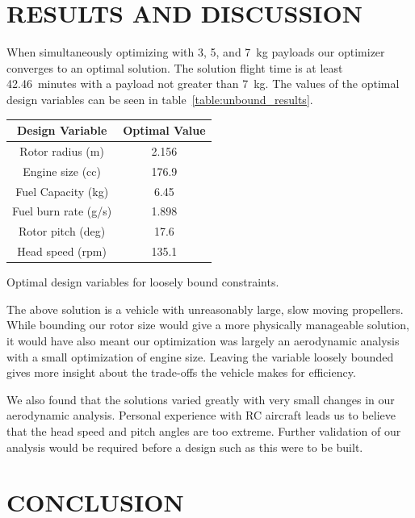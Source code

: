 \documentclass[letterpaper, 10 pt, conference]{ieeeconf}  %
\makeatletter
\newenvironment{tablehere}
  {\def\@captype{table}}
  {}
\makeatother
\begin{document}
\section{RESULTS AND DISCUSSION}

When simultaneously optimizing with 3, 5, and 7~kg payloads our optimizer converges to an optimal solution. The solution flight time is at least 42.46~minutes with a payload not greater than 7~kg. The values of the optimal design variables can be seen in table~\ref{table:unbound_results}. 

\begin{tablehere}
\centering
\vspace{5mm}
	\begin{tabulary}{0.5\textwidth}{|C|C|}
		\hline
		Design Variable & Optimal Value \\ \hline \hline
		Rotor radius (m) & 2.156 \\ \hline
		Engine size (cc) & 176.9 \\ \hline
		Fuel Capacity (kg) & 6.45 \\ \hline
		Fuel burn rate (g/s) & 1.898 \\ \hline
		Rotor pitch (deg) & 17.6 \\ \hline
		Head speed (rpm) & 135.1 \\ \hline
	\end{tabulary}
\caption{Optimal design variables for loosely bound constraints.}
\label{table:unbound_results}
\end{tablehere}

The above solution is a vehicle with unreasonably large, slow moving propellers. While bounding our rotor size would give a more physically manageable solution, it would have also meant our optimization was largely an aerodynamic analysis with a small optimization of engine size. Leaving the variable loosely bounded gives more insight about the trade-offs the vehicle makes for efficiency. 

We also found that the solutions varied greatly with very small changes in our aerodynamic analysis. Personal experience with RC aircraft leads us to believe that the head speed and pitch angles are too extreme. Further validation of our analysis would be required before a design such as this were to be built.  



\section{CONCLUSION}
\end{document}
